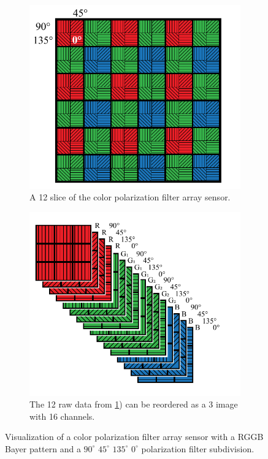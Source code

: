 \begin{figure}[H]
    \begin{subfigure}[T]{.48\textwidth}
        \includegraphics[width=\textwidth]{figures/sensor_layout.pdf}
        \caption{A 12 slice of the color polarization filter array sensor. \label{fig:cpfa}}
    \end{subfigure}%
    \hfill
    \begin{subfigure}[T]{.48\textwidth}
        \includegraphics[width=\textwidth]{figures/sensor_packaging.pdf}
        \caption{The 12 raw data from \ref{fig:cpfa}) can be reordered as a 3 image with 16 channels.
            \label{fig:cpfa_reorder}}
    \end{subfigure}
    \caption{Visualization of a color polarization filter array sensor with a RGGB Bayer pattern and a $90^\circ$ $45^\circ$ $135^\circ$ $0^\circ$ polarization filter subdivision.
        \label{fig:polarization_naming}}
\end{figure}

